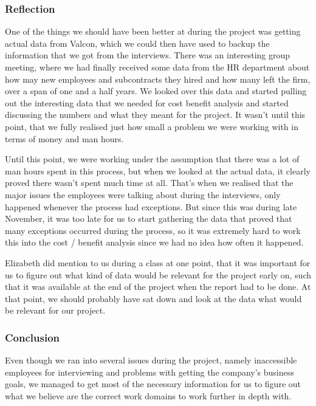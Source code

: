 \subsubsection{Reflection}
One of the things we should have been better at during the project was getting actual data from Valcon, which we could then have used to backup the information that we got from the interviews. There was an interesting group meeting, where we had finally received some data from the HR department about how may new employees and subcontracts they hired and how many left the firm, over a span of one and a half years. We looked over this data and started pulling out the interesting data that we needed for cost benefit analysis and started discussing the numbers and what they meant for the project. It wasn't until this point, that we fully realised just how small a problem we were working with in terms of money and man hours. 

Until this point, we were working under the assumption that there was a lot of man hours spent in this process, but when we looked at the actual data, it clearly proved there wasn't spent much time at all. That's when we realised that the major issues the employees were talking about during the interviews, only happened whenever the process had exceptions. But since this was during late November, it was too late for us to start gathering the data that proved that many exceptions occurred during the process, so it was extremely hard to work this into the cost / benefit analysis since we had no idea how often it happened.

Elizabeth did mention to us during a class at one point, that it was important for us to figure out what kind of data would be relevant for the project early on, such that it was available at the end of the project when the report had to be done. At that point, we should probably have sat down and look at the data what would be relevant for our project.

\subsubsection{Conclusion}
Even though we ran into several issues during the project, namely inaccessible employees for interviewing and problems with getting the company’s business goals, we managed to get most of the necessary information for us to figure out what we believe are the correct work domains to work further in depth with.